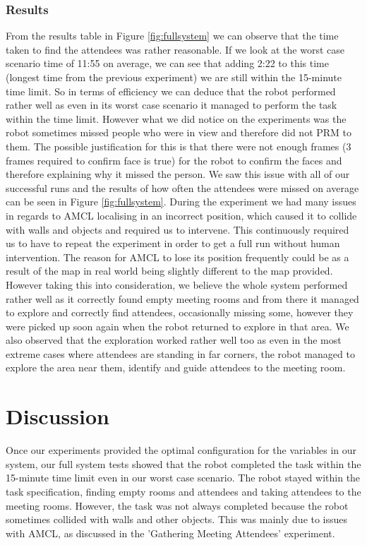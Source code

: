 \documentclass[conference]{IEEEtran}
\begin{document}
\subsubsection{Results}
From the results table  in Figure \ref{fig:fullsystem} we can observe that the time taken to find the attendees was rather reasonable. If we look at the worst case scenario time of 11:55 on average, we can see that adding 2:22 to this time (longest time from the previous experiment) we are still within the 15-minute time limit. So in terms of efficiency we can deduce that the robot performed rather well as even in its worst case scenario it managed to perform the task within the time limit. However what we did notice on the experiments was the robot sometimes missed people who were in view and therefore did not PRM to them. The possible justification for this is that there were not enough frames (3 frames required to confirm face is true) for the robot to confirm the faces and therefore explaining why it missed the person. We saw this issue with all of our successful runs and the results of how often the attendees were missed on average can be seen in  Figure \ref{fig:fullsystem}. During the experiment we had many issues in regards to AMCL localising in an incorrect position, which caused it to collide with walls and objects and required us to intervene. This continuously required us to have to repeat the experiment in order to get a full run without human intervention. The reason for AMCL to lose its position frequently could be as a result of the map in real world being slightly different to the map provided. However taking this into consideration, we believe the whole system performed rather well as it correctly found empty meeting rooms and from there it managed to explore and correctly find attendees, occasionally missing some, however they were picked up soon again when the robot returned to explore in that area. We also observed that the exploration worked rather well too as even in the most extreme cases where attendees are standing in far corners, the robot managed to explore the area near them, identify and guide attendees to the meeting room.

\section{Discussion}
Once our experiments provided the optimal configuration for the variables in our system, our full system tests showed that the robot completed the task within the 15-minute time limit even in our worst case scenario. The robot stayed within the task specification, finding empty rooms and attendees and taking attendees to the meeting rooms. However, the task was not always completed because the robot sometimes collided with walls and other objects. This was mainly due to issues with AMCL, as discussed in the 'Gathering Meeting Attendees' experiment.
\end{document}

